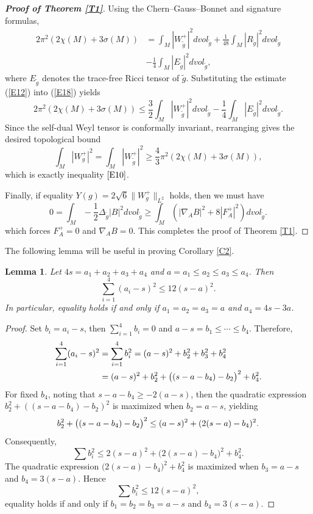 \documentclass[12pt, twoside]{article}
\newtheorem{lemma}[theorem]{Lemma}
\theoremstyle{definition}
\numberwithin{equation}{section}
\def \De {\Delta}
\def\na {\nabla}
\begin{document}
\begin{proof}[\textbf{Proof of Theorem \ref{T1}}]
Using the Chern--Gauss--Bonnet and signature formulas,
\begin{equation}\label{E18}
\begin{split}
2\pi^{2}(2\chi(M)+3\sigma(M))&=\int_{M}|W^{+}_{\tilde{g}}|^{2}dvol_{\tilde{g}}+\frac{1}{48}\int_{M}|R_{\tilde{g}}|^{2}dvol_{\tilde{g}}\\
&-\frac{1}{4}\int_{M}|E_{\tilde{g}}|^{2}dvol_{\tilde{g}},
\end{split}
\end{equation}
where $E_{\tilde{g}}$ denotes the trace-free Ricci tensor of $\tilde{g}$. Substituting the estimate (\ref{E12}) into (\ref{E18}) yields
\begin{equation*}
2\pi^{2}(2\chi(M)+3\sigma(M))\leq\frac{3}{2}\int_{M}|W^{+}_{\tilde{g}}|^{2}dvol_{\tilde{g}}-\frac{1}{4}\int_{M}|E_{\tilde{g}}|^{2}dvol_{\tilde{g}}.
\end{equation*}
Since the self-dual Weyl tensor is conformally invariant, rearranging gives the desired topological bound
\[\int_{M}|W^{+}_{g}|^{2}=\int_{M}|W^{+}_{\tilde{g}}|^{2}\geq\frac{4}{3}\pi^{2}(2\chi(M)+3\sigma(M)),\]
which is exactly inequality $\eqref{E10}$.

Finally, if equality  $Y(g)=2\sqrt{6}\|W^{+}_{g}\|_{L^{2}}$ holds, then we must have
\[0=\int_{M}-\frac{1}{2}\De_{\tilde{g}}|B|^{2}dvol_{\tilde{g}}\geq\int_{M}(|\na_{A}B|^{2}+8|F_{A}^{+}|^{2})dvol_{\tilde{g}}. \]
which forces $F^{+}_{A}=0$ and $\na_{A}B=0$. This completes the proof of Theorem \ref{T1}.

\end{proof}
The following lemma will be useful in proving Corollary \ref{C2}.
\begin{lemma}\label{L5}
Let $4s=a_{1}+a_{2}+a_{3}+a_{4}$ and $a=a_{1}\leq a_{2}\leq a_{3}\leq a_{4}$. Then
\[ \sum_{i=1}^{4}(a_{i}-s)^{2}\leq 12(s-a)^{2}.\]
In particular, equality holds if and only if $a_{1}=a_{2}=a_{3}=a$ and $a_{4}=4s-3a$. 
\end{lemma}


\begin{proof}
Set $b_{i}=a_{i}-s$, then $\sum_{i=1}^{4}b_{i}=0$ and $a-s=b_{1}\leq\cdots\leq b_{4}$. Therefore, 
\begin{equation*}
\begin{split}
\sum_{i=1}^{4}(a_{i}-s)^{2}&=\sum_{i=1}^{4}b_{i}^{2}=(a-s)^{2}+b_{2}^{2}+b_{3}^{2}+b^{2}_{4}\\
&=(a-s)^{2}+b_{2}^{2}+\big{(}(s-a-b_{4})-b_{2}\big{)}^{2}+b_{4}^{2}.
\end{split}
\end{equation*}
For fixed $b_{4}$, noting that $s-a-b_{4}\geq-2(a-s)$, then the quadratic expression $b_2^2 + ((s-a-b_4)-b_2)^2$ is maximized when $b_2 =a-s$, yielding
$$b_{2}^{2}+\big{(}(s-a-b_{4})-b_{2}\big{)}^{2}\leq(a-s)^{2}+(2(s-a)-b_{4})^{2}.$$ 
Consequently,
\[\sum b_i^2 \le 2(s-a)^{2}+\big(2(s-a)-b_4\big)^2 + b_4^2.
\]
The quadratic expression $\big(2(s-a)-b_4\big)^2 + b_4^2$ is maximized when $b_3=a-s$ and $b_4=3(s-a)$.
Hence
\[
\sum b_i^2 \le 12(s-a)^2,
\]
equality holds if and only if $b_{1}=b_{2}=b_{3}=a-s$ and $b_{4}=3(s-a)$. 
\end{proof}
\end{document}
